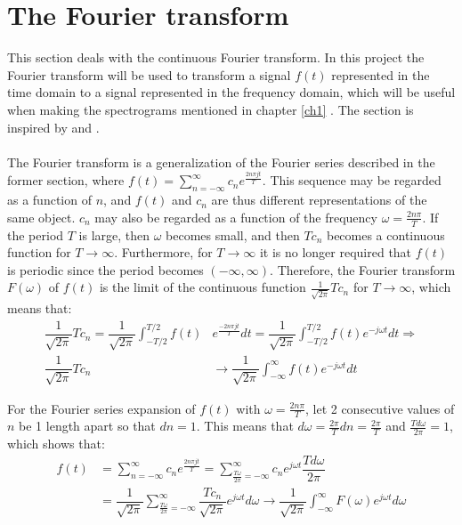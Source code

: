 \section{The Fourier transform}
This section deals with the continuous Fourier transform. In this project the Fourier transform will be used to transform a signal $f(t)$ represented in the time domain to a signal represented in the frequency domain, which will be useful when making the spectrograms mentioned in chapter \ref{ch1} . The section is inspired by \cite{FourierTrans} and \cite{FAA}.
\\ \\
The Fourier transform is a generalization of the Fourier series described in the former section, where $f(t) = \sum_{n=-\infty}^\infty c_n e^{\frac{2n\pi j t}{T}}$. This sequence may be regarded as a function of $n$, and $f(t)$ and $c_n$ are thus different representations of the same object. $c_n$ may also be regarded as a function of the frequency $\omega = \frac{2n\pi}{T}$. If the period $T$ is large, then $\omega$ becomes small, and then $Tc_n$ becomes a continuous function for $T \to \infty$. Furthermore, for $T \to \infty$ it is no longer required that $f(t)$ is periodic since the period becomes $(-\infty,\infty)$. Therefore, the Fourier transform $F(\omega)$ of $f(t)$ is the limit of the continuous function $\frac{1}{\sqrt{2\pi}} T c_n$ for $T \to \infty$, which means that:
\begin{align*}
\dfrac{1}{\sqrt{2\pi}} T c_n = \dfrac{1}{\sqrt{2\pi}} \int_{-T/2}^{T/2} f(t) &e^{\frac{-2n\pi j t}{T}} dt = \dfrac{1}{\sqrt{2\pi}} \int_{-T/2}^{T/2} f(t) e^{-j\omega t} dt \Rightarrow \\
\dfrac{1}{\sqrt{2\pi}} T c_n &\to \dfrac{1}{\sqrt{2\pi}} \int_{-\infty}^\infty f(t) e^{-j \omega t} dt
\end{align*}

\noindent
For the Fourier series expansion of $f(t)$ with $\omega = \frac{2n\pi}{T}$, let 2 consecutive values of $n$ be 1 length apart so that $dn = 1$. This means that $d\omega = \frac{2\pi}{T} dn = \frac{2\pi}{T}$ and $\frac{T d\omega}{2\pi} = 1$, which shows that:
\begin{align*}
f(t) &= \sum_{n=-\infty}^\infty c_n e^{\frac{2n\pi j t}{T}} = \sum_{\frac{T\omega}{2\pi}=-\infty}^\infty c_n e^{j \omega t} \dfrac{T d\omega}{2 \pi} \\
&= \dfrac{1}{\sqrt{2\pi}} \sum_{\frac{T\omega}{2\pi}=-\infty}^\infty \dfrac{T c_n}{\sqrt{2\pi}} e^{j \omega t} d\omega \to \dfrac{1}{\sqrt{2\pi}} \int_{-\infty}^\infty F(\omega) e^{j \omega t} d \omega
\end{align*}

